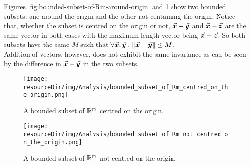 \documentclass[../MathsNotesBase.tex]{subfiles}
\begin{document}
{		
		\biggerskip
		\bigskip
		Figures \ref{fig:bounded-subset-of-Rm-around-origin} and \ref{fig:bounded-subset-of-Rm-not-around-origin} show two bounded subsets: one around the origin and the other not containing the origin.
		Notice that, whether the subset is centred on the origin or not, ${ \vec{\bm{x}} - \vec{\bm{y}} }$ and ${ \vec{\bm{x}} - \vec{\bm{z}} }$ are the same vector in both cases with the maximum length vector being ${ \vec{\bm{x}} - \vec{\bm{z}} }$. So both subsets have the same $M$ such that ${ \forall \vec{\bm{x}},\vec{\bm{y}} \;.\; \norm{\vec{\bm{x}} - \vec{\bm{y}}} \leq M }$.\\
		
		Addition of vectors, however, does not exhibit the same invariance as can be seen by the difference in ${ \vec{\bm{x}} + \vec{\bm{y}} }$ in the two subsets.
		
		\begin{figure}[h!]
			\begin{minipage}{0.9\textwidth} 
				\texttt{[image: \\resourceDir/img/Analysis/bounded\_subset\_of\_Rm\_centred\_on\_the\_origin.png]}    
				\caption{A bounded subset of $\mathbb{R}^{m}$ centred on the origin.}
				\label{fig:bounded-subset-of-Rm-around-origin}  
			\end{minipage}
			
			\vspace{0.75cm}
			\begin{minipage}{0.9\textwidth} 
				\texttt{[image: \\resourceDir/img/Analysis/bounded\_subset\_of\_Rm\_not\_centred\_on\_the\_origin.png]}    
				\caption{A bounded subset of $\mathbb{R}^{m}$ not centred on the origin.}
				\label{fig:bounded-subset-of-Rm-not-around-origin}   
			\end{minipage}			
		\end{figure}
		
}
\end{document}

